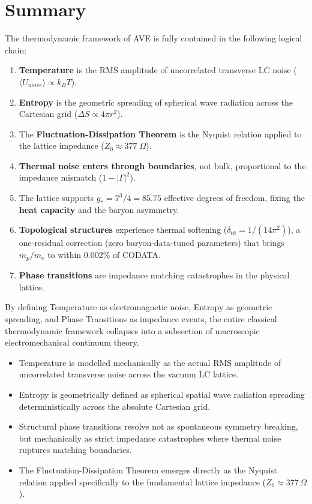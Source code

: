 \section{Summary}

The thermodynamic framework of AVE is fully contained in the following logical chain:

\begin{enumerate}
    \item \textbf{Temperature} is the RMS amplitude of uncorrelated transverse LC noise ($\langle U_{noise} \rangle \propto k_B T$).
    \item \textbf{Entropy} is the geometric spreading of spherical wave radiation across the Cartesian grid ($\Delta S \propto 4\pi r^2$).
    \item The \textbf{Fluctuation-Dissipation Theorem} is the Nyquist relation applied to the lattice impedance ($Z_0 \approx 377\;\Omega$).
    \item \textbf{Thermal noise enters through boundaries}, not bulk, proportional to the impedance mismatch ($1 - |\Gamma|^2$).
    \item The lattice supports $g_* = 7^3/4 = 85.75$ effective degrees of freedom, fixing the \textbf{heat capacity} and the baryon asymmetry.
    \item \textbf{Topological structures} experience thermal softening ($\delta_{th} = 1/(14\pi^2)$), a one-residual correction (zero baryon-data-tuned parameters) that brings $m_p/m_e$ to within 0.002\% of CODATA.
    \item \textbf{Phase transitions} are impedance matching catastrophes in the physical lattice.
\end{enumerate}

By defining Temperature as electromagnetic noise, Entropy as geometric spreading, and Phase Transitions as impedance events, the entire classical thermodynamic framework collapses into a subsection of macroscopic electromechanical continuum theory.

\begin{summarybox}
\begin{itemize}
    \item Temperature is modelled mechanically as the actual RMS amplitude of uncorrelated transverse noise across the vacuum LC lattice.
    \item Entropy is geometrically defined as spherical spatial wave radiation spreading deterministically across the absolute Cartesian grid.
    \item Structural phase transitions resolve not as spontaneous symmetry breaking, but mechanically as strict impedance catastrophes where thermal noise ruptures matching boundaries.
    \item The Fluctuation-Dissipation Theorem emerges directly as the Nyquist relation applied specifically to the fundamental lattice impedance ($Z_0 \approx 377\,\Omega$).
\end{itemize}
\end{summarybox}

